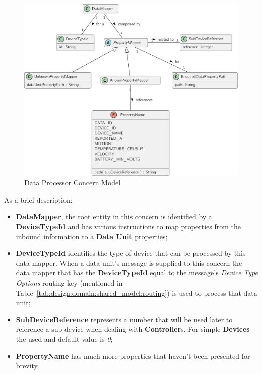 \begin{figure}[H]
   \centering
  \includegraphics[page=1,width=\columnwidth]{assets/diagrams/design/domain/data-processor-model.pdf}
  \caption[Data Processor Concern Model]{Data Processor Concern Model}
  \label{fig:design:domain:bounded_contexts:processor:diagram}
\end{figure}

As a brief description:

\begin{itemize}
   \item \textbf{DataMapper}, the root entity in this concern is identified by a \textbf{DeviceTypeId} and has various instructions to map properties from the inbound information to a \textbf{Data Unit} properties;
   \item \textbf{DeviceTypeId} identifies the type of device that can be processed by this data mapper. When a data unit's message is supplied to this concern the data mapper that has the \textbf{DeviceTypeId} equal to the message's \textit{Device Type Options} routing key (mentioned in Table~\ref{tab:design:domain:shared_model:routing}) is used to process that data unit;
   \item \textbf{SubDeviceReference} represents a number that will be used later to reference a sub device when dealing with \textbf{Controller}s. For simple \textbf{Devices} the used and default value is \textit{0};
   \item \textbf{PropertyName} has much more properties that haven't been presented for brevity.
\end{itemize}

